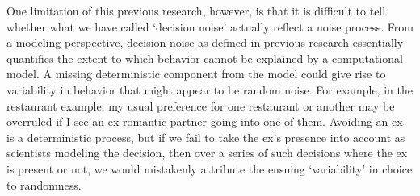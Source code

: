 \documentclass[12pt]{article}
\begin{document}
{	One limitation of this previous research, however, is that it is difficult to tell whether what we have called `decision noise' actually reflect a noise process. From a modeling perspective, decision noise as defined in previous research essentially quantifies the extent to which behavior cannot be explained by a computational model. A missing deterministic component from the model could give rise to variability in behavior that might appear to be random noise. For example, in the restaurant example, my usual preference for one restaurant or another may be overruled if I see an ex romantic partner going into one of them. Avoiding an ex is a deterministic process, but if we fail to take the ex's presence into account as scientists modeling the decision, then over a series of such decisions where the ex is present or not, we would mistakenly attribute the ensuing `variability' in choice to randomness. 
	
	
	
	
}
\end{document}
